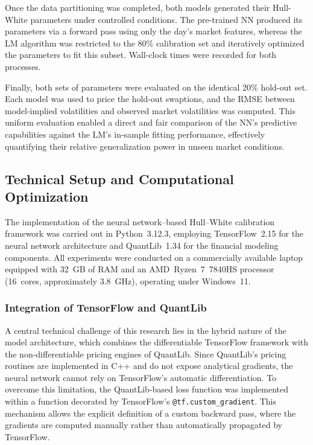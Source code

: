 {Once the data partitioning was completed, both models generated their Hull-White parameters under controlled conditions. The pre-trained NN produced its parameters via a forward pass using only the day’s market features, whereas the LM algorithm was restricted to the 80\% calibration set and iteratively optimized the parameters to fit this subset. Wall-clock times were recorded for both processes.

Finally, both sets of parameters were evaluated on the identical 20\% hold-out set. Each model was used to price the hold-out swaptions, and the RMSE between model-implied volatilities and observed market volatilities was computed. This uniform evaluation enabled a direct and fair comparison of the NN’s predictive capabilities against the LM’s in-sample fitting performance, effectively quantifying their relative generalization power in unseen market conditions.

\subsection{Technical Setup and Computational Optimization}
\label{subsec:technical_setup}
The implementation of the neural network–based Hull–White calibration framework was carried out in Python~3.12.3, employing TensorFlow~2.15 for the neural network architecture and QuantLib~1.34 for the financial modeling components. All experiments were conducted on a commercially available laptop equipped with 32~GB of RAM and an AMD~Ryzen~7~7840HS processor (16~cores, approximately 3.8~GHz), operating under Windows~11.

\subsubsection{Integration of TensorFlow and QuantLib}
A central technical challenge of this research lies in the hybrid nature of the model architecture, which combines the differentiable TensorFlow framework with the non-differentiable pricing engines of QuantLib. Since QuantLib’s pricing routines are implemented in C++ and do not expose analytical gradients, the neural network cannot rely on TensorFlow’s automatic differentiation. To overcome this limitation, the QuantLib-based loss function was implemented within a function decorated by TensorFlow’s \texttt{@tf.custom\_gradient}. This mechanism allows the explicit definition of a custom backward pass, where the gradients are computed manually rather than automatically propagated by TensorFlow.

}
